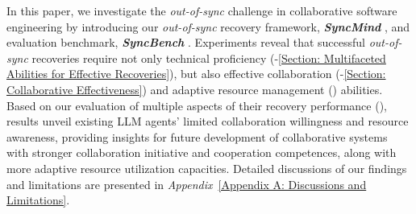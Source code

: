 In this paper, we investigate the \textit{out-of-sync} challenge in collaborative software engineering by introducing our \textit{out-of-sync} recovery framework, \textbf{\textit{SyncMind}} , and evaluation benchmark, \textbf{\textit{SyncBench}} .
Experiments reveal that successful \textit{out-of-sync} recoveries require not only
technical proficiency (-\ref{Section: Multifaceted Abilities for Effective Recoveries}), but also effective collaboration (-\ref{Section: Collaborative Effectiveness}) and adaptive resource management () abilities.
Based on our evaluation of multiple aspects of their recovery performance (), results unveil existing LLM agents' limited collaboration willingness and resource awareness, providing insights for future development of collaborative systems with stronger collaboration initiative and cooperation competences, along with more adaptive resource utilization capacities.
%
%
%
%
Detailed discussions of our findings and limitations are presented in \textit{Appendix}~\ref{Appendix A: Discussions and Limitations}.
